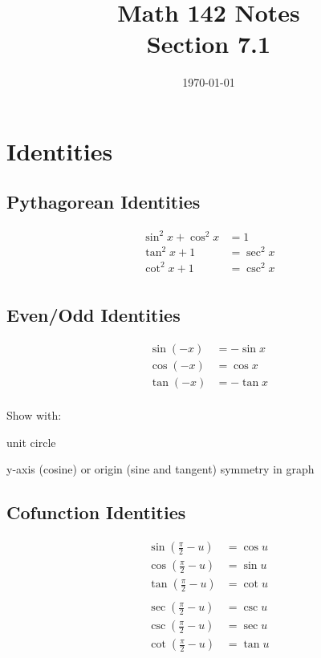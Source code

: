 \documentclass{exam}
\title{Math 142 Notes \\ Section 7.1}
\date{\today}
\begin{document}
  \maketitle
  \tableofcontents

  \section{Identities}
  \subsection{Pythagorean Identities}
  \begin{align*}
    \sin^2 x + \cos^2 x & = 1 \\
    \tan^2 x + 1        & = \sec^2 x \\
    \cot^2 x + 1        & = \csc^2 x \\
  \end{align*}

  \subsection{Even/Odd Identities}
  \begin{align*}
    \sin(-x) & = - \sin x \\
    \cos(-x) & = \cos x \\
    \tan(-x) & = - \tan x \\
  \end{align*}

  Show with:
  \begin{itemize*}
    \item unit circle
    \item y-axis (cosine) or origin (sine and tangent) symmetry in graph
  \end{itemize*}

  \subsection{Cofunction Identities}
  \begin{align*}
    \sin \left( \frac{\pi}{2} - u \right) &= \cos u \\
    \cos \left( \frac{\pi}{2} - u \right) &= \sin u \\
    \tan \left( \frac{\pi}{2} - u \right) &= \cot u \\
    \\
    \sec \left( \frac{\pi}{2} - u \right) &= \csc u \\
    \csc \left( \frac{\pi}{2} - u \right) &= \sec u \\
    \cot \left( \frac{\pi}{2} - u \right) &= \tan u \\
  \end{align*}
\end{document}
